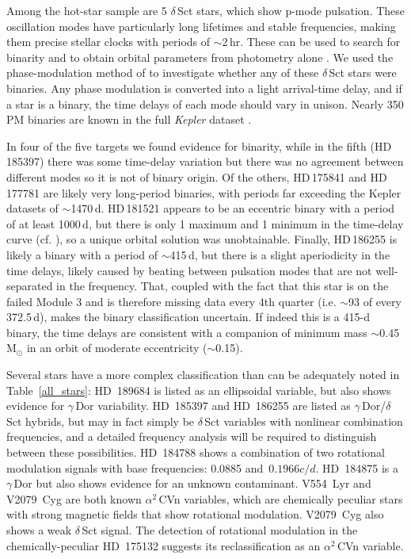 \documentclass[a4paper,fleqn,usenatbib]{mnras}
\begin{document}
Among the hot-star sample are 5 $\delta$\,Sct stars, which show p-mode pulsation. These oscillation modes have particularly long lifetimes and stable frequencies, making them precise stellar clocks with periods of $\sim$2\,hr. These can be used to search for binarity and to obtain orbital parameters from photometry alone \citep{shibahashi&kurtz2012}. We used the phase-modulation method of \citet{murphyetal2014} to investigate whether any of these $\delta$\,Sct stars were binaries. Any phase modulation is converted into a light arrival-time delay, and if a star is a binary, the time delays of each mode should vary in unison. Nearly 350 PM binaries are known in the full \textit{Kepler} dataset \citep{murphyetal2018}.

In four of the five targets we found evidence for binarity, while in the fifth (HD\,185397) there was some time-delay variation but there was no agreement between different modes so it is not of binary origin. Of the others, HD\,175841 and HD\,177781 are likely very long-period binaries, with periods far exceeding the Kepler datasets of $\sim$1470\,d. HD\,181521 appears to be an eccentric binary with a period of at least 1000\,d, but there is only 1 maximum and 1 minimum in the time-delay curve (cf. \citep{murphy&shibahashi2015}), so a unique orbital solution was unobtainable. Finally, HD\,186255 is likely a binary with a period of $\sim$415\,d, but there is a slight aperiodicity in the time delays, likely caused by beating between pulsation modes that are not well-separated in the frequency. That, coupled with the fact that this star is on the failed Module 3 and is therefore missing data every 4th quarter (i.e. $\sim$93 of every 372.5\,d), makes the binary classification uncertain. If indeed this is a 415-d binary, the time delays are consistent with a companion of minimum mass $\sim$0.45\,M$_{\odot}$ in an orbit of moderate eccentricity ($\sim$0.15).

Several stars have a more complex classification than can be adequately noted in Table~\ref{all_stars}: HD~189684 is listed as an ellipsoidal variable, but also shows evidence for $\gamma$\,Dor variability. HD~185397 and HD~186255 are listed as $\gamma$\,Dor/$\delta$\,Sct hybrids, but may in fact simply be $\delta$\,Sct variables with nonlinear combination frequencies, and a detailed frequency analysis will be required to distinguish between these possibilities. HD~184788 shows a combination of two rotational modulation signals with base frequencies: 0.0885 and~$0.1966 c/d$. HD~184875 is a $\gamma$\,Dor but also shows evidence for an unknown contaminant. V554~Lyr and V2079~Cyg are both known $\alpha^2$\,CVn variables, which are chemically peculiar stars with strong magnetic fields that show rotational modulation. V2079~Cyg also shows a weak $\delta$\,Sct signal. The detection of rotational modulation in the chemically-peculiar HD~175132 suggests its reclassification as an $\alpha^2$\,CVn variable. 
\end{document}
